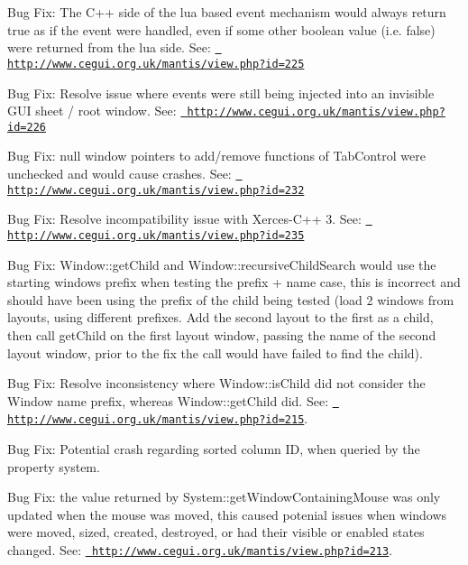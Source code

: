 \begin{DoxyItemize}
\item Bug Fix\+: The C++ side of the lua based event mechanism would always return true as if the event were handled, even if some other boolean value (i.\+e. false) were returned from the lua side. See\+: \href{http://www.cegui.org.uk/mantis/view.php?id=225}{\texttt{ http\+://www.\+cegui.\+org.\+uk/mantis/view.\+php?id=225}}
\item Bug Fix\+: Resolve issue where events were still being injected into an invisible G\+UI sheet / root window. See\+: \href{http://www.cegui.org.uk/mantis/view.php?id=226}{\texttt{ http\+://www.\+cegui.\+org.\+uk/mantis/view.\+php?id=226}}
\item Bug Fix\+: null window pointers to add/remove functions of Tab\+Control were unchecked and would cause crashes. See\+: \href{http://www.cegui.org.uk/mantis/view.php?id=232}{\texttt{ http\+://www.\+cegui.\+org.\+uk/mantis/view.\+php?id=232}}
\item Bug Fix\+: Resolve incompatibility issue with Xerces-\/\+C++ 3. See\+: \href{http://www.cegui.org.uk/mantis/view.php?id=235}{\texttt{ http\+://www.\+cegui.\+org.\+uk/mantis/view.\+php?id=235}}
\item Bug Fix\+: Window\+::get\+Child and Window\+::recursive\+Child\+Search would use the starting window\textquotesingle{}s prefix when testing the prefix + name case, this is incorrect and should have been using the prefix of the child being tested (load 2 windows from layouts, using different prefixes. Add the second layout to the first as a child, then call get\+Child on the first layout window, passing the name of the second layout window, prior to the fix the call would have failed to find the child).
\item Bug Fix\+: Resolve inconsistency where Window\+::is\+Child did not consider the Window name prefix, whereas Window\+::get\+Child did. See\+: \href{http://www.cegui.org.uk/mantis/view.php?id=215}{\texttt{ http\+://www.\+cegui.\+org.\+uk/mantis/view.\+php?id=215}}.
\item Bug Fix\+: Potential crash regarding sorted column ID, when queried by the property system.
\item Bug Fix\+: the value returned by System\+::get\+Window\+Containing\+Mouse was only updated when the mouse was moved, this caused potenial issues when windows were moved, sized, created, destroyed, or had their visible or enabled states changed. See\+: \href{http://www.cegui.org.uk/mantis/view.php?id=213}{\texttt{ http\+://www.\+cegui.\+org.\+uk/mantis/view.\+php?id=213}}.

\end{DoxyItemize}
